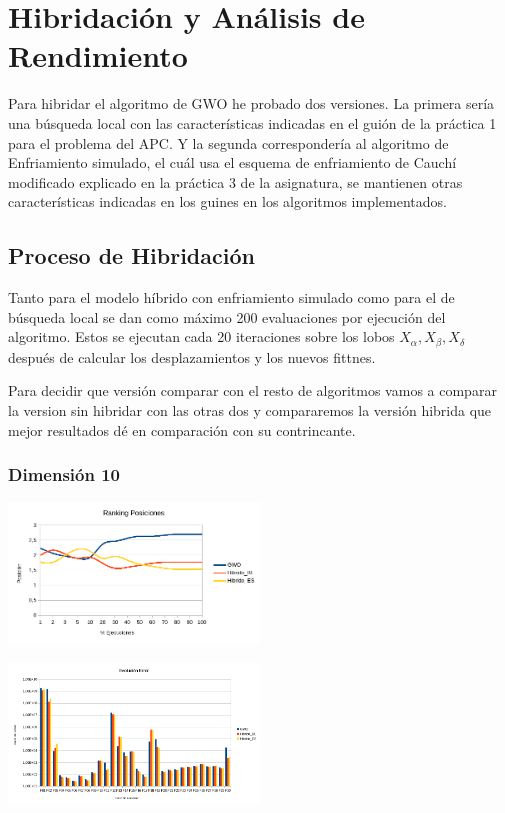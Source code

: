 \documentclass[a4paper, 12.5pt]{report}
\begin{document}
\section{Hibridación y Análisis de Rendimiento}

Para hibridar el algoritmo de GWO he probado dos versiones. La primera sería una búsqueda local con las características indicadas en el guión de la práctica 1 para el problema del APC. Y la segunda correspondería al algoritmo de Enfriamiento simulado, el cuál usa el esquema de enfriamiento de Cauchí modificado explicado en la práctica 3 de la asignatura, se mantienen otras características indicadas en los guines en los algoritmos implementados.



\subsection{Proceso de Hibridación}

Tanto para el modelo híbrido con enfriamiento simulado como para el de búsqueda local se dan como máximo 200 evaluaciones por ejecución del algoritmo. Estos se ejecutan cada 20 iteraciones sobre los lobos $X_\alpha,X_\beta,X_\delta$ después de calcular los desplazamientos y los nuevos fittnes.

Para decidir que versión comparar con el resto de algoritmos vamos a comparar la version sin hibridar con las otras dos y compararemos la versión hibrida que mejor resultados dé en comparación con su contrincante.


\subsubsection*{Dimensión 10}

\includegraphics*[width=0.5\textwidth]{Resultados/hibrido/Interno/D10/media_posicion.png} \label{img:media_posicion_D10_comparativa}


\includegraphics*[width=0.5\textwidth]{Resultados/hibrido/Interno/D10/ev_error.png} \label{img:error_D10_comparativa}
\end{document}
